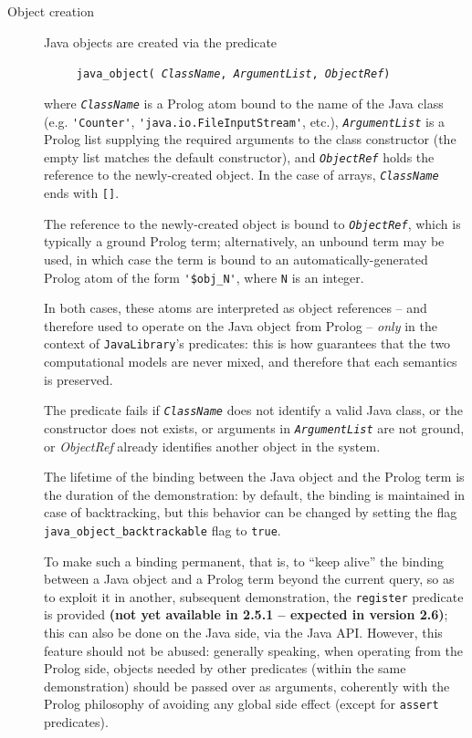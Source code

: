 \begin{description}
  \item [Object creation]
        Java objects are created via the predicate

        \texttt{~~~~~java\_object(%
                 \textit{ClassName}, \textit{ArgumentList}, \textit{ObjectRef})}

        where \texttt{\textit{ClassName}} is a Prolog atom bound to the name of the
        Java class (e.g. \verb|'Counter'|, \verb|'java.io.FileInputStream'|, etc.), \texttt{\textit{ArgumentList}} is a Prolog list supplying the required arguments to the class constructor (the empty list matches the default constructor), and \texttt{\textit{ObjectRef}} holds the reference to the newly-created object.
        In the case of arrays, \texttt{\textit{ClassName}} ends with \texttt{[]}.

        The reference to the newly-created object is bound to \texttt{\textit{ObjectRef}},
        which is typically a ground Prolog term; alternatively, an unbound term
        may be used, in which case the term is bound to an automatically-generated
        Prolog atom of the form \verb|'$obj_N'|, where \texttt{N} is an integer.

        In both cases, these atoms are interpreted as object references --
        and therefore used to operate on the Java object from Prolog -- \textit{only} in the context of \texttt{JavaLibrary}'s predicates: this is how \tuprolog{} guarantees that the two computational models are never mixed, and therefore that each semantics is preserved.

        The predicate fails if \texttt{\textit{ClassName}} does not identify a valid Java class, or the constructor does not exists, or arguments in
        \texttt{\textit{ArgumentList}} are not ground, or \textit{ObjectRef}
        already identifies another object in the system.

        The lifetime of the binding between the Java object and the Prolog term
        is the duration of the demonstration: by default, the binding is maintained in case of backtracking, but this behavior can be changed by setting the flag \texttt{java\_object\_backtrackable} flag to \texttt{true}.

        \color{red}
        To make such a binding permanent, that is, to ``keep alive'' the binding between a Java object and a Prolog term beyond the current query, so as to exploit it in another, subsequent demonstration, the \texttt{register} predicate is provided \textbf{(not yet available in \tuprolog{} 2.5.1 -- expected in version 2.6)};
        \normalcolor
        this can also be done on the Java side, via the \tuprolog{} Java API.
        However, this feature should not be abused: generally speaking, when operating from the Prolog side, objects needed by other predicates (within the same demonstration) should be passed over as arguments, coherently with the Prolog philosophy of avoiding any global side effect (except for \texttt{assert} predicates).


\end{description}

